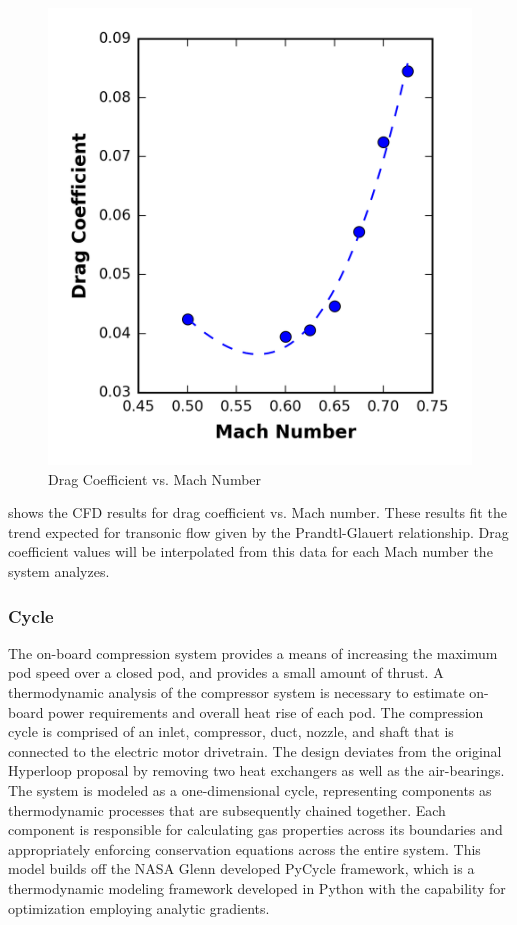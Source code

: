     \begin{figure}
      \centering
      \includegraphics{../../images/graphs/cd_vs_mach/cd_vs_mach.png}
      \caption{Drag Coefficient vs. Mach Number}
      \label{fig:cd_vs_mach}
    \end{figure}
     shows the CFD results for drag coefficient vs. Mach number.
    These results fit the trend expected for transonic flow given by the
    Prandtl-Glauert relationship. Drag coefficient values will be interpolated
    from this data for each Mach number the system analyzes.
  \subsubsection{Cycle}
    The on-board compression system provides a means of increasing the maximum
    pod speed over a closed pod,  and provides a small amount of thrust.
    A thermodynamic analysis of the compressor system is necessary to estimate
    on-board power requirements and overall heat rise of each pod.
    The compression cycle is comprised of an inlet, compressor, duct, nozzle,
    and shaft that is connected to the electric motor drivetrain. The design
    deviates from the original Hyperloop proposal by removing two heat
    exchangers as well as the air-bearings. The system is modeled as a
    one-dimensional cycle, representing components as thermodynamic processes
    that are subsequently chained together. Each component is responsible for
    calculating gas properties across its boundaries and appropriately enforcing
    conservation equations across the entire system. This model builds off the
    NASA Glenn developed PyCycle framework, which is a thermodynamic modeling
    framework developed in Python with the capability for optimization
    employing analytic gradients. \cite{PyCycle}

